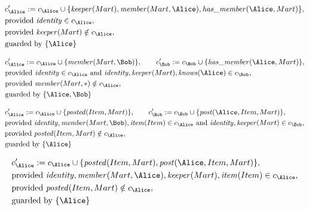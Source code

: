 \begin{align*}
&
c'_
{
\Alice
}
 := 
c_
{
\Alice
}
 \cup 
\{
\mathit{\detokenize{
keeper
}}
(
Mart
)
,
\mathit{\detokenize{
member
}}
(
Mart
,
\Alice
)
,
\mathit{\detokenize{
has_member
}}
(
\Alice
,
Mart
)
\}
,\\
&
\text{provided } 
\mathit{\detokenize{
identity
}}
 \in c_
{
\Alice
}
,\\
&
\text{provided } 
\mathit{\detokenize{
keeper
}}
(
Mart
)
 \notin c_
{
\Alice
}
,\\
&
\text{guarded by } \{
\Alice
\}
\end{align*}

\begin{align*}
&
c'_
{
\Alice
}
 := 
c_
{
\Alice
}
 \cup 
\{
\mathit{\detokenize{
member
}}
(
Mart
,
\Bob
)
\}
, \qquad 
c'_
{
\Bob
}
 := 
c_
{
\Bob
}
 \cup 
\{
\mathit{\detokenize{
has_member
}}
(
\Alice
,
Mart
)
\}
,\\
&
\text{provided } 
\mathit{\detokenize{
identity
}}
 \in c_
{
\Alice
}
 \text{ and } 
\mathit{\detokenize{
identity
}}
,
\mathit{\detokenize{
keeper
}}
(
Mart
)
,
\mathit{\detokenize{
knows
}}
(
\Alice
)
 \in c_
{
\Bob
}
,\\
&
\text{provided } 
\mathit{\detokenize{
member
}}
(
Mart
,
\ast
)
 \notin c_
{
\Alice
}
,\\
&
\text{guarded by } \{
\Alice
,
\Bob
\}
\end{align*}

\begin{align*}
&
c'_
{
\Alice
}
 := 
c_
{
\Alice
}
 \cup 
\{
\mathit{\detokenize{
posted
}}
(
Item
,
Mart
)
\}
, \qquad 
c'_
{
\Bob
}
 := 
c_
{
\Bob
}
 \cup 
\{
\mathit{\detokenize{
post
}}
(
\Alice
,
Item
,
Mart
)
\}
,\\
&
\text{provided } 
\mathit{\detokenize{
identity
}}
,
\mathit{\detokenize{
member
}}
(
Mart
,
\Bob
)
,
\mathit{\detokenize{
item
}}
(
Item
)
 \in c_
{
\Alice
}
 \text{ and } 
\mathit{\detokenize{
identity
}}
,
\mathit{\detokenize{
keeper
}}
(
Mart
)
 \in c_
{
\Bob
}
,\\
&
\text{provided } 
\mathit{\detokenize{
posted
}}
(
Item
,
Mart
)
 \notin c_
{
\Alice
}
,\\
&
\text{guarded by } \{
\Alice
\}
\end{align*}

\begin{align*}
&
c'_
{
\Alice
}
 := 
c_
{
\Alice
}
 \cup 
\{
\mathit{\detokenize{
posted
}}
(
Item
,
Mart
)
,
\mathit{\detokenize{
post
}}
(
\Alice
,
Item
,
Mart
)
\}
,\\
&
\text{provided } 
\mathit{\detokenize{
identity
}}
,
\mathit{\detokenize{
member
}}
(
Mart
,
\Alice
)
,
\mathit{\detokenize{
keeper
}}
(
Mart
)
,
\mathit{\detokenize{
item
}}
(
Item
)
 \in c_
{
\Alice
}
,\\
&
\text{provided } 
\mathit{\detokenize{
posted
}}
(
Item
,
Mart
)
 \notin c_
{
\Alice
}
,\\
&
\text{guarded by } \{
\Alice
\}
\end{align*}
